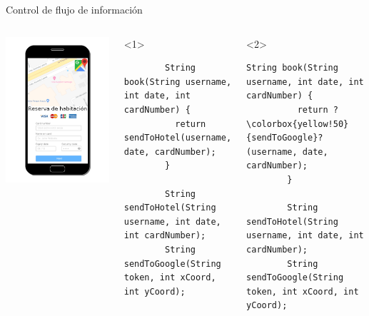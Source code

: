 \documentclass[aspectratio=169,10pt]{beamer}
\begin{document}
\begin{frame}[fragile]{Control de flujo de información}
  \begin{columns}[T,onlytextwidth]
    \includegraphics[width=1.0\textwidth]{images/book.png}
    \vspace{1cm}
    \begin{onlyenv}<1>
      \begin{lstlisting}
        String book(String username, int date, int cardNumber) {
          return sendToHotel(username, date, cardNumber);
        }

        String sendToHotel(String username, int date, int cardNumber);
        String sendToGoogle(String token, int xCoord, int yCoord);
      \end{lstlisting}
    \end{onlyenv}
    \begin{onlyenv}<2>
      \begin{lstlisting}[escapechar=?]
        String book(String username, int date, int cardNumber) {
          return ?\colorbox{yellow!50}{sendToGoogle}?(username, date, cardNumber);
        }

        String sendToHotel(String username, int date, int cardNumber);
        String sendToGoogle(String token, int xCoord, int yCoord);
      \end{lstlisting}
    \end{onlyenv}

  \end{columns}
\end{frame}
\end{document}
